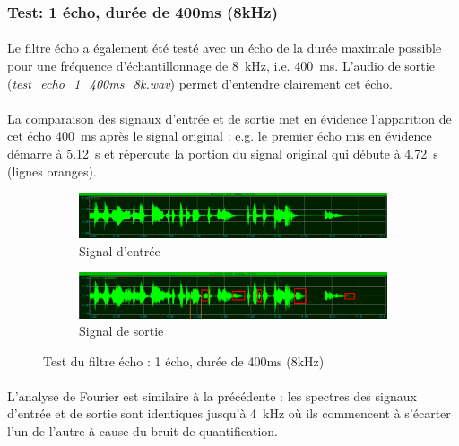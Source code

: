 \documentclass{article}
\begin{document}
    \subsubsection{Test: 1 écho, durée de 400ms (8kHz)}
    \paragraph{}
    Le filtre écho a également été testé avec un écho de la durée maximale possible pour une fréquence d'échantillonnage de \SI{8}{\kilo\hertz}, i.e. \SI{400}{\milli\second}. L'audio de sortie (\emph{test\_echo\_1\_400ms\_8k.wav}) permet d'entendre clairement cet écho.

    \paragraph{}
    La comparaison des signaux d'entrée et de sortie met en évidence l'apparition de cet écho \SI{400}{\milli\second} après le signal original : e.g. le premier écho mis en évidence démarre à \SI{5.12}{\second} et répercute la portion du signal original qui débute à \SI{4.72}{\second} (lignes oranges).

    \begin{figure}[H]
        \centering
        \begin{subfigure}[b]{\textwidth}
            \centering
            \includegraphics[width=\textwidth]{./images/in_angelou_8k.png}
            \caption{Signal d'entrée}
        \end{subfigure}
        \begin{subfigure}[b]{\textwidth}
            \centering
            \includegraphics[width=\textwidth]{./images/out_echo_1_400ms_8k.png}
            \caption{Signal de sortie}
            \label{fig:echo_8k_out}
        \end{subfigure}
        \caption{Test du filtre écho : 1 écho, durée de 400ms (8kHz)}
    \end{figure}

    \paragraph{}
    L'analyse de Fourier est similaire à la précédente : les spectres des signaux d'entrée et de sortie sont identiques jusqu'à \SI{4}{\kilo\hertz} où ils commencent à s'écarter l'un de l'autre à cause du bruit de quantification.
\end{document}
